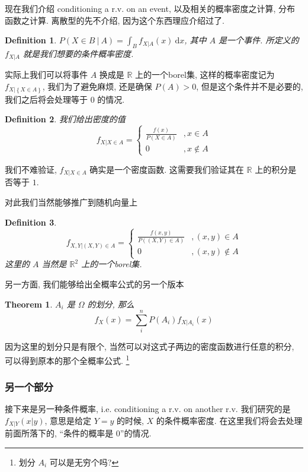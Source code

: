 \documentclass[a4paper, 10pt]{ctexart} %
\newtheorem{theorem}{Theorem}
\newtheorem{definition}{Definition}
\begin{document}
现在我们介绍 conditioning a r.v. on an event, 以及相关的概率密度之计算, 分布函数之计算. 离散型的先不介绍, 因为这个东西理应介绍过了. 
\begin{definition}
    $\displaystyle P\left(X \in B \ | \ A\right) = \int  _{B} f _{X  |  A } \left(x\right) \ \mathrm{d}x$, 其中 $A$ 是一个事件. 所定义的 $f _{X  |  A}$ 就是我们想要的条件概率密度.
\end{definition}
实际上我们可以将事件 $A$ 换成是 $\mathbb{R}$ 上的一个borel集, 这样的概率密度记为 $f _{X| \left\{X \in A\right\}}$, 我们为了避免麻烦, 还是确保 $P \left(A\right) > 0$, 但是这个条件并不是必要的, 我们之后将会处理等于 $0$ 的情况. 

\begin{definition}
    我们给出密度的值
    \[
    f _{X | X \in A} = 
    \begin{cases}
        \frac{f \left(x\right)}{P\left(X \in A\right)}& , x \in A\\ 
        0& , x \notin A
    \end{cases}
    \]
\end{definition}
我们不难验证, $f _{X | X \in A}$ 确实是一个密度函数. 这需要我们验证其在 $\mathbb{R}$ 上的积分是否等于 $1$.

对此我们当然能够推广到随机向量上
\begin{definition}
    \[
    f _{X , Y | (X, Y  ) \in A} = 
    \begin{cases}
        \frac{f \left(x, y\right) }{ P\left( \left(X , Y\right) \in A   \right)} & , \left(x, y\right) \in A \\ 
        0 & , \left(x, y\right) \notin A 
    \end{cases} 
    \] 
    这里的 $A$ 当然是 $\mathbb{R} ^{2}$ 上的一个borel集.
\end{definition}
另一方面, 我们能够给出全概率公式的另一个版本
\begin{theorem}
    $A _{i}$ 是 $\Omega$ 的划分, 那么
    \[
    f _{X} \left(x\right) = \sum_{  i} ^{n} P\left(A _{i}\right) f_{X | A_i} \left(x\right) 
    \]
\end{theorem}
因为这里的划分只是有限个, 当然可以对这式子两边的密度函数进行任意的积分, 可以得到原本的那个全概率公式. \footnote{划分 $A_i$ 可以是无穷个吗?}
\subsubsection{另一个部分}
接下来是另一种条件概率, i.e. conditioning a r.v. on another r.v.
我们研究的是 $f _{X | Y} (x | y)$, 意思是给定 $Y= y$ 的时候, $X$ 的条件概率密度. 在这里我们将会去处理前面所落下的, 
``条件的概率是 $0$''的情况. 
\end{document}

